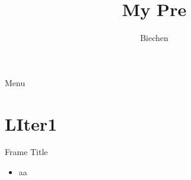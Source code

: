 \documentclass{beamer}
\title{My Pre}
\author[PKU]{Biechen}
\begin{document}
\maketitle

\begin{frame}{Menu}
    \tableofcontents
\end{frame}


\section{LIter1}
\begin{frame}{Frame Title}
    \begin{itemize}
        \item aa
    \end{itemize}
\end{frame}
\end{document}
